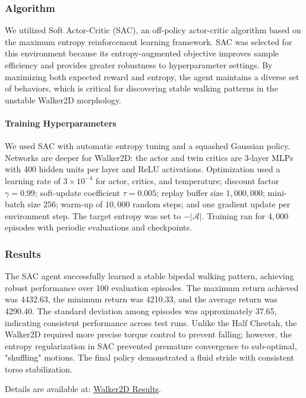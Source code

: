 \documentclass[10pt]{article}
\begin{document}
\subsubsection{Algorithm}
We utilized Soft Actor-Critic (SAC), an off-policy actor-critic algorithm based on the maximum entropy reinforcement learning framework. SAC was selected for this environment because its entropy-augmented objective improves sample efficiency and provides greater robustness to hyperparameter settings. By maximizing both expected reward and entropy, the agent maintains a diverse set of behaviors, which is critical for discovering stable walking patterns in the unstable Walker2D morphology.

\paragraph{Training Hyperparameters}
We used SAC with automatic entropy tuning and a squashed Gaussian policy. Networks are deeper for Walker2D: the actor and twin critics are 3-layer MLPs with 400 hidden units per layer and ReLU activations. Optimization used a learning rate of $3\times10^{-4}$ for actor, critics, and temperature; discount factor $\gamma = 0.99$; soft-update coefficient $\tau = 0.005$; replay buffer size $1{,}000{,}000$; mini-batch size $256$; warm-up of $10{,}000$ random steps; and one gradient update per environment step. The target entropy was set to $-\lvert\mathcal{A}\rvert$. Training ran for $4{,}000$ episodes with periodic evaluations and checkpoints.

\subsubsection{Results}
The SAC agent successfully learned a stable bipedal walking pattern, achieving robust performance over 100 evaluation episodes. The maximum return achieved was 4432.63, the minimum return was 4210.33, and the average return was 4290.40. The standard deviation among episodes was approximately 37.65, indicating consistent performance across test runs. Unlike the Half Cheetah, the Walker2D required more precise torque control to prevent falling; however, the entropy regularization in SAC prevented premature convergence to sub-optimal, "shuffling" motions. The final policy demonstrated a fluid stride with consistent torso stabilization.

Details are available at:
\href{https://sites.google.com/view/rewardrush-teampiratesofthegym/results/walker}{Walker2D Results}.
\end{document}
